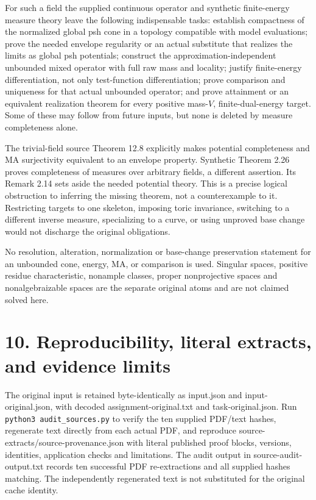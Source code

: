 \documentclass[11pt]{article}
\begin{document}
For such a field the supplied continuous operator and synthetic finite-energy measure theory leave the following indispensable tasks: establish compactness of the normalized global psh cone in a topology compatible with model evaluations; prove the needed envelope regularity or an actual substitute that realizes the limits as global psh potentials; construct the approximation-independent unbounded mixed operator with full raw mass and locality; justify finite-energy differentiation, not only test-function differentiation; prove comparison and uniqueness for that actual unbounded operator; and prove attainment or an equivalent realization theorem for every positive mass-\(V\), finite-dual-energy target. Some of these may follow from future inputs, but none is deleted by measure completeness alone.

The trivial-field source Theorem 12.8 explicitly makes potential completeness and MA surjectivity equivalent to an envelope property. Synthetic Theorem 2.26 proves completeness of measures over arbitrary fields, a different assertion. Its Remark 2.14 sets aside the needed potential theory. This is a precise logical obstruction to inferring the missing theorem, not a counterexample to it. Restricting targets to one skeleton, imposing toric invariance, switching to a different inverse measure, specializing to a curve, or using unproved base change would not discharge the original obligations.

No resolution, alteration, normalization or base-change preservation statement for an unbounded cone, energy, MA, or comparison is used. Singular spaces, positive residue characteristic, nonample classes, proper nonprojective spaces and nonalgebraizable spaces are the separate original atoms and are not claimed solved here.

\section*{10. Reproducibility, literal extracts, and evidence limits}

The original input is retained byte-identically as input.json and input-original.json, with decoded assignment-original.txt and task-original.json. Run \texttt{python3 audit\_sources.py} to verify the ten supplied PDF/text hashes, regenerate text directly from each actual PDF, and reproduce source-extracts/source-provenance.json with literal published proof blocks, versions, identities, application checks and limitations. The audit output in source-audit-output.txt records ten successful PDF re-extractions and all supplied hashes matching. The independently regenerated text is not substituted for the original cache identity.
\end{document}
